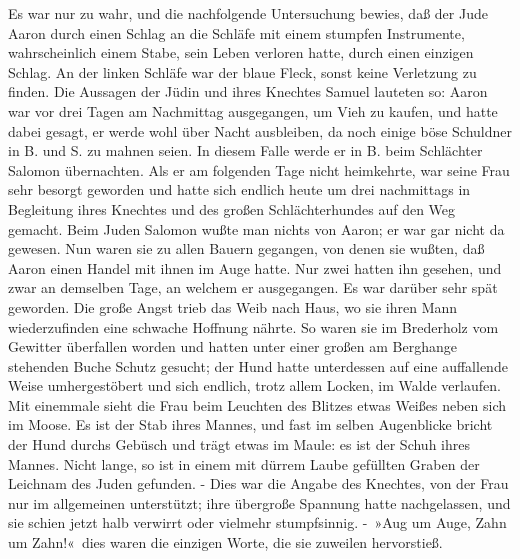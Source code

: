 Es war nur zu wahr, und die nachfolgende Untersuchung bewies, daß der Jude Aaron durch einen Schlag an die Schläfe mit einem stumpfen Instrumente, wahrscheinlich einem Stabe, sein Leben verloren hatte, durch einen einzigen Schlag. An der linken Schläfe war der blaue Fleck, sonst keine Verletzung zu finden. Die Aussagen der Jüdin und ihres Knechtes Samuel lauteten so: Aaron war vor drei Tagen am Nachmittag ausgegangen, um Vieh zu kaufen, und hatte dabei gesagt, er werde wohl über Nacht ausbleiben, da noch einige böse Schuldner in B. und S. zu mahnen seien. In diesem Falle werde er in B. beim Schlächter Salomon übernachten. Als er am folgenden Tage nicht heimkehrte, war seine Frau sehr besorgt geworden und hatte sich endlich heute um drei nachmittags in Begleitung ihres Knechtes und des großen Schlächterhundes auf den Weg gemacht. Beim Juden Salomon wußte man nichts von Aaron; er war gar nicht da gewesen. Nun waren sie zu allen Bauern gegangen, von denen sie wußten, daß Aaron einen Handel mit ihnen im Auge hatte. Nur zwei hatten ihn gesehen, und zwar an demselben Tage, an welchem er ausgegangen. Es war darüber sehr spät geworden. Die große Angst trieb das Weib nach Haus, wo sie ihren Mann wiederzufinden eine schwache Hoffnung nährte. So waren sie im Brederholz vom Gewitter überfallen worden und hatten unter einer großen am Berghange stehenden Buche Schutz gesucht; der Hund hatte unterdessen auf eine auffallende Weise umhergestöbert und sich endlich, trotz allem Locken, im Walde verlaufen. Mit einemmale sieht die Frau beim Leuchten des Blitzes etwas Weißes neben sich im Moose. Es ist der Stab ihres Mannes, und fast im selben Augenblicke bricht der Hund durchs Gebüsch und trägt etwas im Maule: es ist der Schuh ihres Mannes. Nicht lange, so ist in einem mit dürrem Laube gefüllten Graben der Leichnam des Juden gefunden. - Dies war die Angabe des Knechtes, von der Frau nur im allgemeinen unterstützt; ihre übergroße Spannung hatte nachgelassen, und sie schien jetzt halb verwirrt oder vielmehr stumpfsinnig. - »Aug um Auge, Zahn um Zahn!« dies waren die einzigen Worte, die sie zuweilen hervorstieß.


